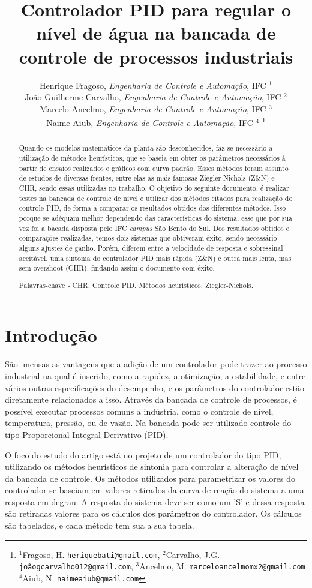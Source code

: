 \documentclass[conference]{IEEEtran}
\title{\LARGE \bf Controlador PID para regular o nível de água na bancada de controle de processos industriais}
\author{Henrique Fragoso, \textit{Engenharia de Controle e Automação}, IFC $^{1}$ 
\\ João Guilherme Carvalho, \textit{Engenharia de Controle e Automação}, IFC $^{2}$
\\ Marcelo Ancelmo, \textit{Engenharia de Controle e Automação}, IFC $^{3}$
\\ Naime Aiub, \textit{Engenharia de Controle e Automação}, IFC $^{4}$
\thanks{$^{1}$Fragoso, H. {\tt\small heriquebati@gmail.com}, $^{2}$Carvalho, J.G. {\tt\small joãogcarvalho012@gmail.com}, $^{3}$Ancelmo, M. {\tt\small marceloancelmomx2@gmail.com} $^{4}$Aiub, N. {\tt\small naimeaiub@gmail.com}}
}
\date{}
\begin{document}
\maketitle
\thispagestyle{plain}
\pagestyle{empty}



\begin{abstract}
    Quando os modelos matemáticos da planta são desconhecidos, faz-se necessário a utilização de métodos heurísticos, 
    que se baseia em obter os parâmetros necessários à partir de ensaios realizados e gráficos com curva padrão. 
    Esses métodos foram assunto de estudos de diversas frentes, entre elas as mais famosas Ziegler-Nichols (Z\&N) e CHR,
     sendo essas utilizadas no trabalho. O objetivo do seguinte documento, é realizar testes na bancada de controle 
     de nível e utilizar dos métodos citados para realização do controle PID, de forma a comparar os resultados obtidos 
     dos diferentes métodos. Isso porque se adéquam melhor dependendo das características do sistema, 
     esse que por sua vez foi a bacada disposta pelo IFC \textit{campus} São Bento do Sul. 
     Dos resultados obtidos e comparações realizadas, temos dois sistemas que obtiveram êxito, 
     sendo necessário alguns ajustes de ganho. Porém, diferem entre a velocidade de resposta e sobressinal aceitável, 
     uma sintonia do controlador PID mais rápida (Z\&N) e outra mais lenta, mas sem overshoot (CHR), findando assim o 
     documento com êxito.

    Palavras-chave\textit{ - }CHR, Controle PID, Métodos heurísticos, Ziegler-Nichols.
\end{abstract}

\section{Introdução}

São imensas as vantagens que a adição de um controlador pode trazer ao processo industrial na qual é inserido, como a rapidez, a otimização, a estabilidade, e entre vários outras especificações do desempenho, e os parâmetros do controlador estão diretamente relacionados a isso. Através da bancada de controle de processos, é possível executar processos comuns a indústria, como o controle de nível, temperatura, pressão, ou de vazão. Na bancada pode ser utilizado controle do tipo Proporcional-Integral-Derivativo (PID).

O foco do estudo do artigo está no projeto de um controlador do tipo PID, utilizando os métodos heurísticos de sintonia  para controlar a alteração de nível da bancada de controle. Os métodos utilizados para parametrizar os valores do controlador se baseiam em valores retirados da curva de reação do sistema a uma resposta em degrau. A resposta do sistema deve ser como um 'S' e dessa resposta são retiradas valores para os cálculos dos parâmetros do controlador. Os cálculos são tabelados, e cada método tem sua a sua tabela.
\end{document}
